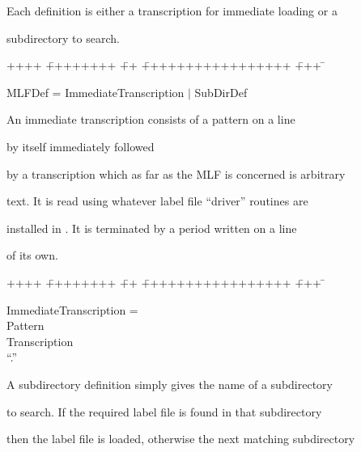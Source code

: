 Each definition is either a transcription for immediate loading or a


subdirectory to search.





{\sf


\begin{tabbing}


++++ \= ++++++++ \= ++ \= +++++++++++++++++ \= +++ \=  \kill


\>    MLFDef  = \> ImmediateTranscription $|$ SubDirDef


\end{tabbing}


}





An immediate transcription consists of a pattern on a line


by itself immediately followed


by a transcription which as far as the MLF is concerned is arbitrary


text.  It is read using whatever label file ``driver'' routines are


installed in .  It is terminated by a period written on a line


of its own.





{\sf


\begin{tabbing}


++++ \= ++++++++ \= ++ \= +++++++++++++++++ \= +++ \=  \kill


\>   ImmediateTranscription = \\


\>\>                    Pattern \\


\>\>                    Transcription \\


\>\>``.'' 


\end{tabbing}


}


A subdirectory definition  simply gives the name of a subdirectory


to search.  If the required label file is found in that subdirectory


then the label file is loaded, otherwise the next matching subdirectory


